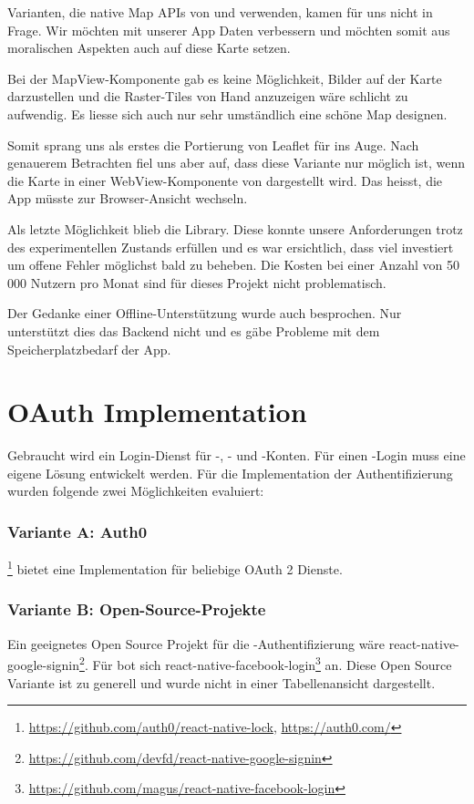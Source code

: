 Varianten, die native Map APIs von  und  verwenden, kamen für uns nicht in Frage.
Wir möchten mit unserer App  Daten verbessern und möchten somit aus moralischen Aspekten auch auf diese Karte setzen. 

Bei der  MapView-Komponente gab es keine Möglichkeit, Bilder auf der Karte darzustellen und die Raster-Tiles von Hand anzuzeigen wäre schlicht zu aufwendig. 
Es liesse sich auch nur sehr umständlich eine schöne Map designen.

Somit sprang uns als erstes die Portierung von Leaflet für  ins Auge. 
Nach genauerem Betrachten fiel uns aber auf, dass diese Variante nur möglich ist, wenn die Karte in einer WebView-Komponente von  dargestellt wird. 
Das heisst, die App müsste zur Browser-Ansicht wechseln.

Als letzte Möglichkeit blieb die  Library.
Diese konnte unsere Anforderungen trotz des experimentellen Zustands erfüllen und es war ersichtlich, dass  viel investiert um offene Fehler möglichst bald zu beheben.
Die Kosten bei einer Anzahl von 50 000 Nutzern pro Monat sind für dieses Projekt nicht problematisch.\cite{mapbox-pricing}

Der Gedanke einer Offline-Unterstützung wurde auch besprochen.
Nur unterstützt dies das Backend nicht und es gäbe Probleme mit dem Speicherplatzbedarf der App. 


\section{OAuth Implementation}
\label{tb-evaluation-oauth}
Gebraucht wird ein Login-Dienst für -, - und -Konten. 
Für einen -Login muss eine eigene Lösung entwickelt werden. 
Für die Implementation der Authentifizierung wurden folgende zwei Möglichkeiten evaluiert:


\subsubsection{Variante A: Auth0}
\footnote{\url{https://github.com/auth0/react-native-lock}, \url{https://auth0.com/}} bietet eine Implementation für beliebige \gls{OAuth} 2 Dienste. 


\subsubsection{Variante B: Open-Source-Projekte}
Ein geeignetes Open Source Projekt für die -Authentifizierung wäre react-native-google-signin\footnote{\url{https://github.com/devfd/react-native-google-signin}}. 
Für  bot sich react-native-facebook-login\footnote{\url{https://github.com/magus/react-native-facebook-login}} an. 
Diese Open Source Variante ist zu generell und wurde nicht in einer Tabellenansicht dargestellt. 

